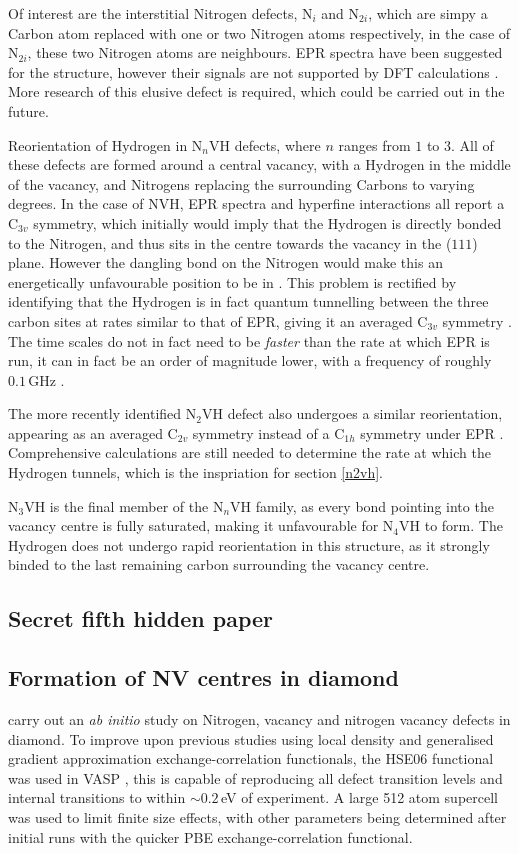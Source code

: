 \documentclass[10pt,a4paper,twocolumn,twoside]{extarticle}
\begin{document}
Of interest are the interstitial Nitrogen defects, N$_i$ and N$_{2i}$, which are simpy a Carbon atom replaced with one or two Nitrogen atoms respectively, in the case of N$_{2i}$, these two Nitrogen atoms are neighbours. EPR spectra have been suggested for the structure, however their signals are not supported by DFT calculations \cite{Atumi_2013}. More research of this elusive defect is required, which could be carried out in the future.

Reorientation of Hydrogen in N$_n$VH defects, where $n$ ranges from $1$ to $3$. All of these defects are formed around a central vacancy, with a Hydrogen in the middle of the vacancy, and Nitrogens replacing the surrounding Carbons to varying degrees. In the case of NVH, EPR spectra and hyperfine interactions all report a C$_{3v}$ symmetry, which initially would imply that the Hydrogen is directly bonded to the Nitrogen, and thus sits in the centre towards the vacancy in the ($1 1 1$) plane. However the dangling bond on the Nitrogen would make this an energetically unfavourable position to be in \cite{Goss_NVH}. This problem is rectified by identifying that the Hydrogen is in fact quantum tunnelling between the three carbon sites at rates similar to that of EPR, giving it an averaged C$_{3v}$ symmetry \cite{Shaw_QT_VH}. The time scales do not in fact need to be \emph{faster} than the rate at which EPR is run, it can in fact be an order of magnitude lower, with a frequency of roughly $0.1$\,GHz \cite{Edwards_N2VH_rate}.

The more recently identified N$_{2}$VH defect also undergoes a similar reorientation, appearing as an averaged C$_{2v}$ symmetry instead of a C$_{1h}$ symmetry under EPR \cite{Peaker}. Comprehensive calculations are still needed to determine the rate at which the Hydrogen tunnels, which is the inspriation for section \ref{n2vh}. 

N$_{3}$VH is the final member of the N$_{n}$VH family, as every bond pointing into the vacancy centre is fully saturated, making it unfavourable for N$_{4}$VH to form. The Hydrogen does not undergo rapid reorientation in this structure, as it strongly binded to the last remaining carbon surrounding the vacancy centre. 

\subsection{Secret fifth hidden paper}

\subsection{Formation of NV centres in diamond}
\textcite{Deak} carry out an \emph{ab initio} study on Nitrogen, vacancy and nitrogen vacancy defects in diamond. To improve upon previous studies using local density and generalised gradient approximation exchange-correlation functionals, the HSE$06$ functional \cite{HSE06} was used in VASP \cite{VASP}, this is capable of reproducing all defect transition levels and internal transitions to within $\sim0.2$\,eV of experiment. A large 512 atom supercell was used to limit finite size effects, with other parameters being determined after initial runs with the quicker PBE exchange-correlation functional. 
\end{document}
